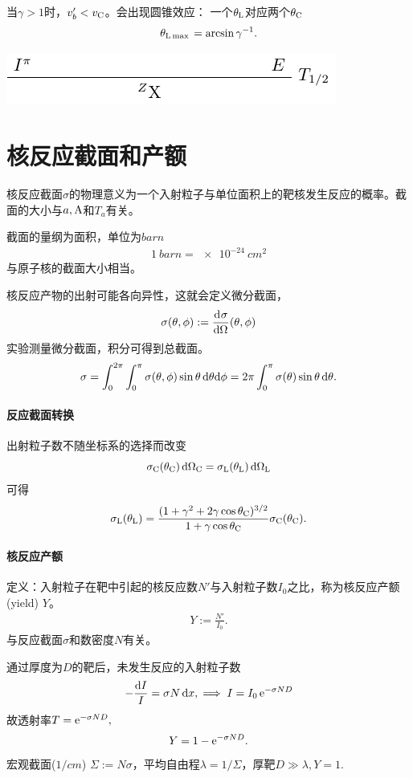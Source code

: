 当$\gamma>1$时，$v_b'<v_{\mathrm C}$。会出现圆锥效应：
一个$\theta_{\mathrm L}$对应两个$\theta_{\mathrm C}$
\[
	\theta_{\mathrm L\max{}}=\arcsin\gamma^{-1}.
\]
\begin{center}
	\includegraphics[page=11]{figures/tikz/layouts.pdf}
\end{center}

\section{核反应截面和产额}
核反应截面$\sigma$的物理意义为一个入射粒子与单位面积上的靶核发生反应的概率。截面的大小与$a,\mathrm{A}$和$T_a$有关。

截面的量纲为面积，单位为$\si{barn}$
\begin{align}
	\SI{1}{barn}=\SI{e-24}{cm^2}
\end{align}
与原子核的截面大小相当。

核反应产物的出射可能各向异性，这就会定义微分截面，
\begin{align}
	\sigma(\theta,\phi):=\frac{\mathrm{d}^{{}}\sigma}{\mathrm{d}{\Omega}^{{}}}(\theta,\phi)
\end{align}
实验测量微分截面，积分可得到总截面。
\[
	\sigma=\int_0^{2\pi}\int_0^\pi\sigma(\theta,\phi)\sin\theta\mathop{}\!\mathrm{d}\theta\mathrm{d}\phi=2\pi\int_0^\pi\sigma(\theta)\sin\theta\mathop{}\!\mathrm{d}\theta.
\]
\paragraph{反应截面转换}出射粒子数不随坐标系的选择而改变
\[
	\sigma_{\mathrm C}(\theta_{\mathrm C})\mathop{}\!\mathrm{d}\Omega_{\mathrm C}=\sigma_{\mathrm L}(\theta_{\mathrm L})\mathop{}\!\mathrm{d}\Omega_{\mathrm L}
\]
可得
\[
	\sigma_{\mathrm L}(\theta_{\mathrm L})=\frac{(1+\gamma^2+2\gamma\cos\theta_{\mathrm C})^{3/2}}{1+\gamma\cos\theta_{\mathrm C}}\sigma_{\mathrm C}(\theta_{\mathrm C}).
\]
\paragraph{核反应产额}定义：入射粒子在靶中引起的核反应数$N'$与入射粒子数$I_0$之比，称为核反应产额(yield) $Y$。
\begin{align}
	Y:=\frac{N'}{I_0}.
\end{align}
与反应截面$\sigma$和数密度$N$有关。

通过厚度为$D$的靶后，未发生反应的入射粒子数
\[
	-\frac{\mathop{}\!\mathrm{d} I}{I}=\sigma N\mathop{}\!\mathrm{d} x,\implies I=I_0\mathop{}\!\mathrm{e}^{-\sigma ND}
\]
故透射率$T=\mathop{}\!\mathrm{e}^{-\sigma ND},$
\begin{align}
	Y=1-\mathop{}\!\mathrm{e}^{-\sigma ND}.
\end{align}
宏观截面($\si{1/cm}$) $\Sigma:=N\sigma$，平均自由程$\lambda=1/\Sigma$，厚靶$D\gg\lambda,Y=1.$

